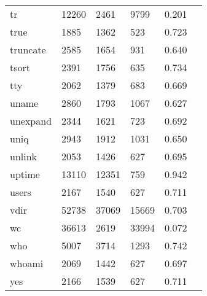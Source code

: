 \begin{longtable}{lp{2.20cm}p{2.20cm}p{2.20cm}p{2.20cm}p{2.20cm}}
tr        &                    12260 &         2461 &          9799 &                    0.201 \\
true      &                     1885 &         1362 &           523 &                    0.723 \\
truncate  &                     2585 &         1654 &           931 &                    0.640 \\
tsort     &                     2391 &         1756 &           635 &                    0.734 \\
tty       &                     2062 &         1379 &           683 &                    0.669 \\
uname     &                     2860 &         1793 &          1067 &                    0.627 \\
unexpand  &                     2344 &         1621 &           723 &                    0.692 \\
uniq      &                     2943 &         1912 &          1031 &                    0.650 \\
unlink    &                     2053 &         1426 &           627 &                    0.695 \\
uptime    &                    13110 &        12351 &           759 &                    0.942 \\
users     &                     2167 &         1540 &           627 &                    0.711 \\
vdir      &                    52738 &        37069 &         15669 &                    0.703 \\
wc        &                    36613 &         2619 &         33994 &                    0.072 \\
who       &                     5007 &         3714 &          1293 &                    0.742 \\
whoami    &                     2069 &         1442 &           627 &                    0.697 \\
yes       &                     2166 &         1539 &           627 &                    0.711 \\
\end{longtable}
